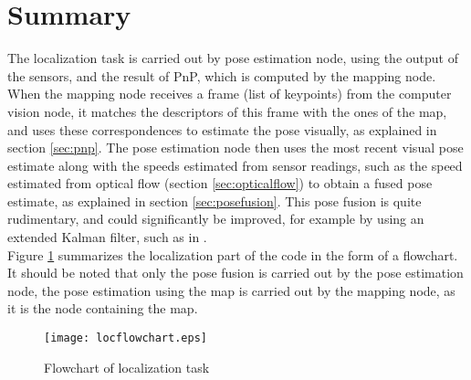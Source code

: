 \section{Summary}
The localization task is carried out by pose estimation node, using the output of the sensors, and the result of PnP, which is computed by the mapping node. When the mapping node receives a frame (list of keypoints) from the computer vision node, it matches the descriptors of this frame with the ones of the map, and uses these correspondences to estimate the pose visually, as explained in section \ref{sec:pnp}. The pose estimation node then uses the most recent visual pose estimate along with the speeds estimated from sensor readings, such as the speed estimated from optical flow (section \ref{sec:opticalflow}) to obtain a fused pose estimate, as explained in section \ref{sec:posefusion}. This pose fusion is quite rudimentary, and could significantly be improved, for example by using an extended Kalman filter, such as in \cite{engel2011msc}.\\

Figure \ref{fig:locflowchart} summarizes the localization part of the code in the form of a flowchart. It should be noted that only the pose fusion is carried out by the pose estimation node, the pose estimation using the map is carried out by the mapping node, as it is the node containing the map.
\begin{figure}[H]
\centering
\texttt{[image: locflowchart.eps]}
\caption{Flowchart of localization task}
\label{fig:locflowchart}
\end{figure}
